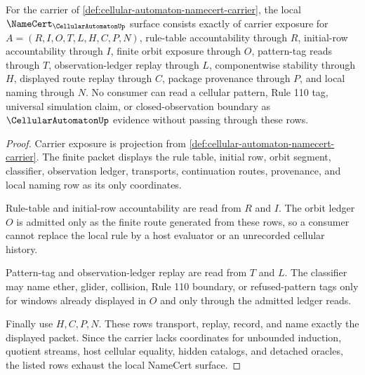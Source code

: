 \begin{theorem}
\label{thm:cellular-automaton-namecert-obligations}
For the carrier of \autoref{def:cellular-automaton-namecert-carrier}, the local $\NameCert_{\CellularAutomatonUp}$ surface consists exactly of carrier exposure for $A=(R,I,O,T,L,H,C,P,N)$, rule-table accountability through $R$, initial-row accountability through $I$, finite orbit exposure through $O$, pattern-tag reads through $T$, observation-ledger replay through $L$, componentwise stability through $H$, displayed route replay through $C$, package provenance through $P$, and local naming through $N$. No consumer can read a cellular pattern, Rule 110 tag, universal simulation claim, or closed-observation boundary as $\CellularAutomatonUp$ evidence without passing through these rows.
\end{theorem}
\begin{proof}
Carrier exposure is projection from \autoref{def:cellular-automaton-namecert-carrier}. The finite packet displays the rule table, initial row, orbit segment, classifier, observation ledger, transports, continuation routes, provenance, and local naming row as its only coordinates.

Rule-table and initial-row accountability are read from $R$ and $I$. The orbit ledger $O$ is admitted only as the finite route generated from these rows, so a consumer cannot replace the local rule by a host evaluator or an unrecorded cellular history.

Pattern-tag and observation-ledger replay are read from $T$ and $L$. The classifier may name ether, glider, collision, Rule 110 boundary, or refused-pattern tags only for windows already displayed in $O$ and only through the admitted ledger reads.

Finally use $H,C,P,N$. These rows transport, replay, record, and name exactly the displayed packet. Since the carrier lacks coordinates for unbounded induction, quotient streams, host cellular equality, hidden catalogs, and detached oracles, the listed rows exhaust the local NameCert surface.
\end{proof}

